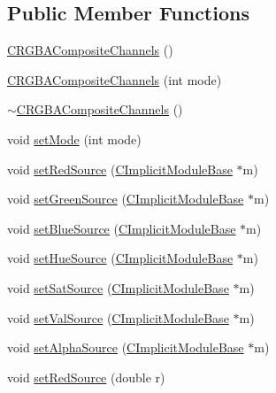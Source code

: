 \subsection*{Public Member Functions}
\begin{DoxyCompactItemize}
\item 
\hyperlink{classanl_1_1CRGBACompositeChannels_a26a38641c67d80d215347e481ff98223}{CRGBACompositeChannels} ()
\item 
\hyperlink{classanl_1_1CRGBACompositeChannels_ad332ce5fa4b819216b6a9b6e4146c50e}{CRGBACompositeChannels} (int mode)
\item 
\hyperlink{classanl_1_1CRGBACompositeChannels_a6861fbee62224a5b93c6e9b20838ca76}{$\sim$CRGBACompositeChannels} ()
\item 
void \hyperlink{classanl_1_1CRGBACompositeChannels_a1ad032faa7ba877873e4f3ce73b0a7fc}{setMode} (int mode)
\item 
void \hyperlink{classanl_1_1CRGBACompositeChannels_a0c7259e36768382246354da99861256a}{setRedSource} (\hyperlink{classanl_1_1CImplicitModuleBase}{CImplicitModuleBase} $\ast$m)
\item 
void \hyperlink{classanl_1_1CRGBACompositeChannels_a2da4f8baac0d07a57dc9a493bf289b97}{setGreenSource} (\hyperlink{classanl_1_1CImplicitModuleBase}{CImplicitModuleBase} $\ast$m)
\item 
void \hyperlink{classanl_1_1CRGBACompositeChannels_a77a094b9b2de02ada1780b8ee9e47cb9}{setBlueSource} (\hyperlink{classanl_1_1CImplicitModuleBase}{CImplicitModuleBase} $\ast$m)
\item 
void \hyperlink{classanl_1_1CRGBACompositeChannels_a8e84b039216e4469b780122135dc686b}{setHueSource} (\hyperlink{classanl_1_1CImplicitModuleBase}{CImplicitModuleBase} $\ast$m)
\item 
void \hyperlink{classanl_1_1CRGBACompositeChannels_a1ce8876b3b0aad111db348de224a2b56}{setSatSource} (\hyperlink{classanl_1_1CImplicitModuleBase}{CImplicitModuleBase} $\ast$m)
\item 
void \hyperlink{classanl_1_1CRGBACompositeChannels_a304e1e3c22846fcd7ebd28eec30848fc}{setValSource} (\hyperlink{classanl_1_1CImplicitModuleBase}{CImplicitModuleBase} $\ast$m)
\item 
void \hyperlink{classanl_1_1CRGBACompositeChannels_a58b16b0f4bc75a29de4cfe4bb4f1e79f}{setAlphaSource} (\hyperlink{classanl_1_1CImplicitModuleBase}{CImplicitModuleBase} $\ast$m)
\item 
void \hyperlink{classanl_1_1CRGBACompositeChannels_ad9cd624a17954c67fc0e2b881231e51f}{setRedSource} (double r)

\end{DoxyCompactItemize}
